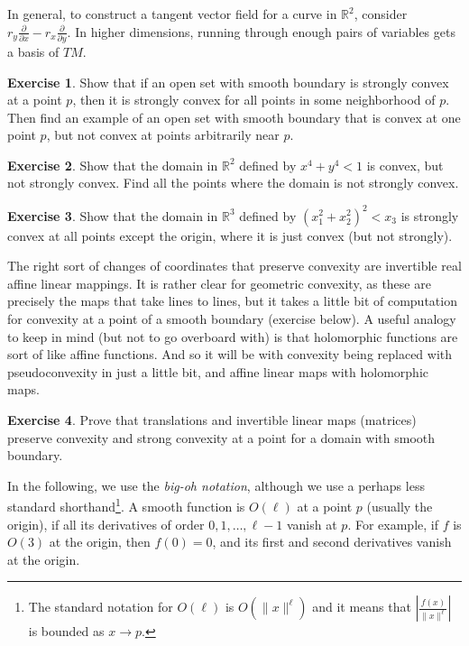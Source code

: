 \documentclass[12pt,openany]{book}
\newcommand{\snorm}[1]{\lVert {#1} \rVert}
\newcommand{\abs}[1]{\left\lvert {#1} \right\rvert}
\newcommand{\R}{{\mathbb{R}}}
\newcommand{\myindex}[1]{#1\index{#1}}
\theoremstyle{plain}
\theoremstyle{remark}
\theoremstyle{definition}
\newenvironment{exbox}{%
    \def\FrameCommand{\vrule width 1pt \relax\hspace{10pt}}%
    \MakeFramed{\advance\hsize-\width\FrameRestore}%
}{%
    \endMakeFramed
}
\theoremstyle{exercise}
\newtheorem{exercise}{Exercise}[section]
\theoremstyle{example}
\begin{document}
In general, to construct a tangent vector field for
a curve in $\R^2$,
consider
$r_y \frac{\partial}{\partial x} - r_x \frac{\partial}{\partial y}$.  In
higher dimensions, running through enough pairs of variables gets
a basis of $TM$.

\begin{exbox}
\begin{exercise}
Show that if an open set with smooth boundary is strongly convex at a point $p$,
then it is strongly convex for all points in some neighborhood of $p$.
Then find an example of
an open set with smooth boundary that is convex at one point $p$,
but not convex at points arbitrarily near $p$.
\end{exercise}

\begin{exercise}
Show that the domain in $\R^2$ defined by $x^4+y^4 < 1$ is convex, but not strongly convex.
Find all the points where the domain is not strongly convex.
\end{exercise}

\begin{exercise}
Show that the domain in $\R^3$ defined by ${(x_1^2+x_2^2)}^2 < x_3$ is
strongly convex at all points except the origin, where it is just convex
(but not strongly).
\end{exercise}
\end{exbox}

The right sort of changes of coordinates that preserve convexity are
invertible real affine linear mappings.
It is rather clear for geometric convexity, as these are precisely the maps
that take lines to lines,
but it takes a little bit of computation for convexity at a point of
a smooth boundary (exercise below).
A useful analogy to keep in mind (but not to go overboard with) is that
holomorphic functions are sort of like affine functions.  And so it will be
with convexity being replaced with pseudoconvexity in just a little bit, and
affine linear maps with holomorphic maps.

\begin{exbox}
\begin{exercise}
Prove that translations and invertible linear maps (matrices) preserve
convexity and strong convexity at a point for a domain with smooth boundary.
\end{exercise}
\end{exbox}

In the following, %
we use the \emph{\myindex{big-oh notation}},
although we use a perhaps less standard shorthand\footnote{%
The standard notation for $O(\ell)$ is $O(\snorm{x}^{\ell})$ and
it means that
$\abs{\frac{f(x)}{\snorm{x}^\ell}}$ is bounded as $x \to p$.}.
A smooth function is $O(\ell)$ at a point $p$ (usually the origin),
if all its derivatives of order $0, 1, \ldots,  \ell-1$ vanish at $p$.
For example, if $f$ is $O(3)$ at the origin,
then $f(0)=0$, and its first and second derivatives vanish at the origin.
\end{document}

